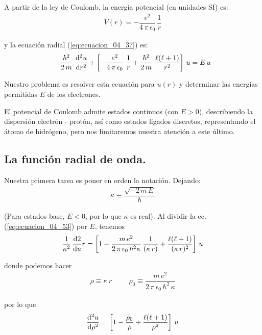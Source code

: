 A partir de la ley de Coulomb, la energía potencial (en unidades SI) es:
\begin{align}
V(r) = - \dfrac{e^{2}}{4 \, \pi \, \epsilon_{0}} \, \dfrac{1}{r}
\end{align}

y la ecuación radial (\ref{eq:ecuacion_04_37}) es:
\begin{align}
- \dfrac{\hbar^{2}}{2 \, m} \; \dv[2]{u}{r} + \left[ - \dfrac{e^{2}}{4 \, \pi \, \epsilon_{0}} \; \dfrac{1}{r} + \dfrac{\hbar^{2}}{2 \, m} \; \dfrac{\ell(\ell +1)}{r^{2}} \right] \, u =  E \, u
\label{eq:ecuacion_04_53}
\end{align}

Nuestro problema es resolver esta ecuación para $u(r)$ y determinar las energías permitidas $E$ de los electrones. 
\par
El potencial de Coulomb admite estados continuos (con $E > 0$), describiendo la dispersión  electrón - protón, así como estados ligados discretos, representando el átomo de hidrógeno, pero nos limitaremos nuestra atención a este último.

\subsection{La función radial de onda.}

Nuestra primera tarea es poner en orden la notación. Dejando:
\begin{align}
\kappa \equiv \dfrac{\sqrt{-2 \, m \, E}}{\hbar}
\label{eq:ecuacion_04_54}
\end{align}

(Para estados base, $E < 0$, por lo que $\kappa$ es real). Al dividir la ec. (\ref{eq:ecuacion_04_53}) por $E$, tenemos
\begin{align*}
\dfrac{1}{\kappa^{2}} \, \dv{2}{u}{r} = \left[1 - \dfrac{m \, e^{2}}{2 \, \pi \, \epsilon_{0} \,\hbar^{2} \kappa} \, \dfrac{1}{(\kappa \, r)} + \dfrac{\ell (\ell + 1)}{(\kappa \, r)^{2}} \right] \, u
\end{align*}

donde podemos hacer
\begin{align}
\rho \equiv \kappa \, r \hspace{1cm} \rho_{0} \equiv \dfrac{m \, e^{2}}{2 \, \pi \, \epsilon_{0} \, \hbar^{2} \, \kappa}
\label{eq:ecuacion_04_55}
\end{align}

por lo que
\begin{align}
\dv[2]{u}{\rho} = \left[ 1 - \dfrac{\rho_{0}}{\rho} + \dfrac{\ell (\ell + 1)}{\rho^{2}} \right] \, u
\label{eq:ecuacion_04_56}
\end{align}


